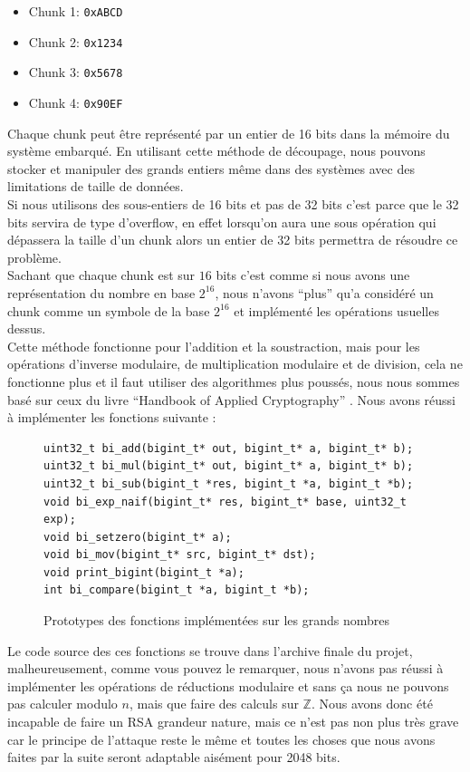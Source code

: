 \begin{itemize}
\item Chunk 1: \texttt{0xABCD}
\item Chunk 2: \texttt{0x1234}
\item Chunk 3: \texttt{0x5678}
\item Chunk 4: \texttt{0x90EF}
\end{itemize}

Chaque chunk peut être représenté par un entier de 16 bits dans la mémoire du système embarqué. En utilisant cette méthode de découpage, nous pouvons stocker et manipuler des grands entiers même dans des systèmes avec des limitations de taille de données.\\

Si nous utilisons des sous-entiers de 16 bits et pas de 32 bits c'est parce que le 32 bits servira de type d'overflow, en effet lorsqu'on aura une sous opération qui dépassera la taille d'un chunk alors un entier de 32 bits permettra de résoudre ce problème.\\

Sachant que chaque chunk est sur $16$ bits c'est comme si nous avons une représentation du nombre en base $2^{16}$, nous n'avons ``plus'' qu'a considéré un chunk comme un symbole de la base $2^{16}$ et implémenté les opérations usuelles dessus.\\

Cette méthode fonctionne pour l'addition et la soustraction, mais pour les opérations d'inverse modulaire, de multiplication modulaire et de division, cela ne fonctionne plus et il faut utiliser des algorithmes plus poussés, nous nous sommes basé sur ceux du livre ``Handbook of Applied Cryptography'' \cite{hac:ch14}. Nous avons réussi à implémenter les fonctions suivante :
\begin{figure}[H]
\begin{verbatim}
uint32_t bi_add(bigint_t* out, bigint_t* a, bigint_t* b);
uint32_t bi_mul(bigint_t* out, bigint_t* a, bigint_t* b);
uint32_t bi_sub(bigint_t *res, bigint_t *a, bigint_t *b);
void bi_exp_naif(bigint_t* res, bigint_t* base, uint32_t exp);
void bi_setzero(bigint_t* a);
void bi_mov(bigint_t* src, bigint_t* dst);
void print_bigint(bigint_t *a);
int bi_compare(bigint_t *a, bigint_t *b);
\end{verbatim}
\caption{Prototypes des fonctions implémentées sur les grands nombres}
\label{fig:proto_fn}
\end{figure}

Le code source des ces fonctions se trouve dans l'archive finale du projet, malheureusement, comme vous pouvez le remarquer, nous n'avons pas réussi à implémenter les opérations de réductions modulaire et sans ça nous ne pouvons pas calculer modulo $n$, mais que faire des calculs sur $\mathbb{Z}$. Nous avons donc été incapable de faire un RSA grandeur nature, mais ce n'est pas non plus très grave car le principe de l'attaque reste le même et toutes les choses que nous avons faites par la suite seront adaptable aisément pour 2048 bits.

